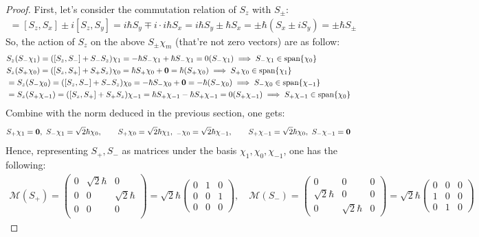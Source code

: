 \documentclass{article}
\begin{document}
\begin{proof}
    First, let's consider the commutation relation of $S_z$ with $S_\pm$:
    \begin{align}
        [S_z, S_\pm] = [S_z,S_x]\pm i[S_z,S_y] = i\hbar S_y \mp i\cdot i\hbar S_x = i\hbar S_y \pm \hbar S_x = \pm \hbar (S_x\pm iS_y) = \pm\hbar S_\pm
    \end{align}
    So, the action of $S_z$ on the above $S_\pm\chi_m$ (that're not zero vectors) are as follow:
    \begin{align}
        &S_z(S_-\chi_1) = ([S_z,S_-]+S_-S_z)\chi_1 = -\hbar S_-\chi_1 + \hbar S_-\chi_1 = 0(S_-\chi_1) \implies S_-\chi_1 \in \text{span}\{\chi_0\}\\
        &S_z(S_+\chi_0) = ([S_z,S_+]+S_+S_z)\chi_0 = \hbar S_+\chi_0 + \mathbf{0} = \hbar(S_+\chi_0) \implies S_+\chi_0 \in \text{span}\{\chi_1\}\\
        &= S_z(S_-\chi_0) = ([S_z,S_-]+S_-S_z)\chi_0 = -\hbar S_-\chi_0 + \mathbf{0} = -\hbar(S_-\chi_0)\implies S_-\chi_0 \in \text{span}\{\chi_{-1}\}\\
        &= S_z(S_+\chi_{-1}) = ([S_z,S_+]+S_+S_z)\chi_{-1} = \hbar S_+\chi_{-1} - \hbar S_+\chi_{-1} = 0(S_+\chi_{-1})\implies S_+\chi_{-1} \in \text{span}\{\chi_0\}
    \end{align}
    Combine with the norm deduced in the previous section, one gets:
    \begin{align}
        S_+\chi_1 = \bzero,\ S_-\chi_1 = \sqrt{2}\hbar \chi_0,\quad\quad S_+\chi_0 = \sqrt{2}\hbar \chi_1,\ _-\chi_0 = \sqrt{2}\hbar \chi_{-1},\quad\quad S_+\chi_{-1}=\sqrt{2}\hbar \chi_0,\ S_-\chi_{-1}=\bzero
    \end{align}
    Hence, representing $S_+,S_-$ as matrices under the basis $\chi_1,\chi_0,\chi_{-1}$, one has the following:
    \begin{align}
        \mathcal{M}(S_+) = \begin{pmatrix}
            0 & \sqrt{2}\hbar &0\\
            0 &0 & \sqrt{2}\hbar\\
            0&0 & 0\\
        \end{pmatrix} = \sqrt{2}\hbar\begin{pmatrix}
            0&1&0\\0&0&1\\0&0&0
        \end{pmatrix},\quad \mathcal{M}(S_-) = \begin{pmatrix}
            0&0&0\\
            \sqrt{2}\hbar &0&0\\
            0&\sqrt{2}\hbar &0
        \end{pmatrix} = \sqrt{2}\hbar\begin{pmatrix}
            0&0&0\\1&0&0\\0&1&0
        \end{pmatrix}
    \end{align}


\end{proof}
\end{document}
